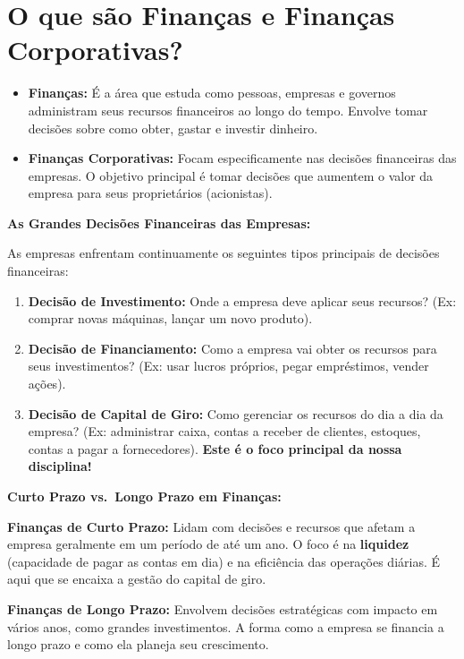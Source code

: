 \documentclass[
  a4paper,
]{book}
\begin{document}
\section{\texorpdfstring{\textbf{O que são Finanças e Finanças
Corporativas?}}{O que são Finanças e Finanças Corporativas?}}\label{o-que-suxe3o-finanuxe7as-e-finanuxe7as-corporativas}

\begin{itemize}
\item
  \textbf{Finanças:} É a área que estuda como pessoas, empresas e
  governos administram seus recursos financeiros ao longo do tempo.
  Envolve tomar decisões sobre como obter, gastar e investir dinheiro.
\item
  \textbf{Finanças Corporativas:} Focam especificamente nas decisões
  financeiras das empresas. O objetivo principal é tomar decisões que
  aumentem o valor da empresa para seus proprietários (acionistas).
\end{itemize}

\textbf{As Grandes Decisões Financeiras das Empresas:}

As empresas enfrentam continuamente os seguintes tipos principais de
decisões financeiras:

\begin{enumerate}
\def\labelenumi{\arabic{enumi}.}
\item
  \textbf{Decisão de Investimento:} Onde a empresa deve aplicar seus
  recursos? (Ex: comprar novas máquinas, lançar um novo produto).
\item
  \textbf{Decisão de Financiamento:} Como a empresa vai obter os
  recursos para seus investimentos? (Ex: usar lucros próprios, pegar
  empréstimos, vender ações).
\item
  \textbf{Decisão de Capital de Giro:} Como gerenciar os recursos do dia
  a dia da empresa? (Ex: administrar caixa, contas a receber de
  clientes, estoques, contas a pagar a fornecedores). \textbf{Este é o
  foco principal da nossa disciplina!}
\end{enumerate}

\textbf{Curto Prazo vs.~Longo Prazo em Finanças:}

\textbf{Finanças de Curto Prazo:} Lidam com decisões e recursos que
afetam a empresa geralmente em um período de até um ano. O foco é na
\textbf{liquidez} (capacidade de pagar as contas em dia) e na eficiência
das operações diárias. É aqui que se encaixa a gestão do capital de
giro.

\textbf{Finanças de Longo Prazo:} Envolvem decisões estratégicas com
impacto em vários anos, como grandes investimentos. A forma como a
empresa se financia a longo prazo e como ela planeja seu crescimento.
\end{document}
